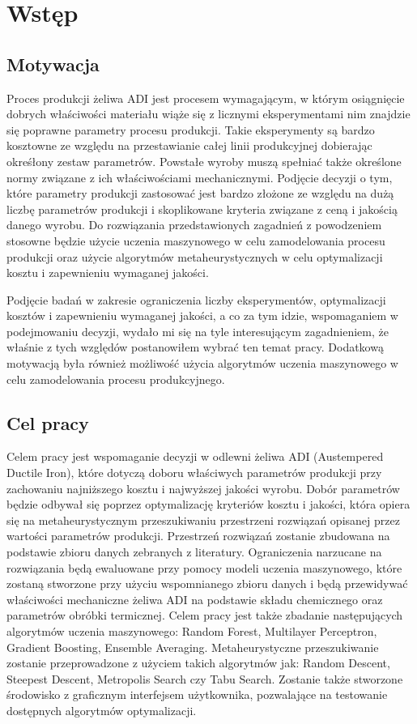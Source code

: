 
\chapter{Wstęp}

\section{Motywacja}
Proces produkcji żeliwa ADI jest procesem wymagającym, w którym osiągnięcie dobrych właściwości materiału wiąże się z licznymi eksperymentami nim znajdzie się poprawne parametry procesu produkcji. Takie eksperymenty są bardzo kosztowne ze względu na przestawianie całej linii produkcyjnej dobierając okreśłony zestaw parametrów. Powstałe wyroby muszą spełniać także określone normy związane z ich właściwościami mechanicznymi. Podjęcie decyzji o tym, które parametry produkcji zastosować jest bardzo złożone ze względu na dużą liczbę parametrów produkcji i skoplikowane kryteria związane z ceną i jakością danego wyrobu. Do rozwiązania przedstawionych zagadnień z powodzeniem stosowne będzie użycie uczenia maszynowego w celu zamodelowania procesu produkcji oraz użycie algorytmów metaheurystycznych w celu optymalizacji kosztu i zapewnieniu wymaganej jakości.

Podjęcie badań w zakresie ograniczenia liczby eksperymentów, optymalizacji kosztów i zapewnieniu wymaganej jakości, a co za tym idzie, wspomaganiem w podejmowaniu decyzji, wydało mi się na tyle interesującym zagadnieniem, że właśnie z tych względów postanowiłem wybrać ten temat pracy. Dodatkową motywacją była również możliwość użycia algorytmów uczenia maszynowego w celu zamodelowania procesu produkcyjnego.

\section{Cel pracy}
Celem pracy jest wspomaganie decyzji w odlewni żeliwa ADI (Austempered Ductile Iron), które dotyczą doboru właściwych parametrów produkcji przy zachowaniu najniższego kosztu i najwyższej jakości wyrobu. Dobór parametrów będzie odbywał się poprzez optymalizację kryteriów kosztu i jakości, która opiera się na metaheurystycznym przeszukiwaniu przestrzeni rozwiązań opisanej przez wartości parametrów produkcji. Przestrzeń rozwiązań zostanie zbudowana na podstawie zbioru danych zebranych z literatury. Ograniczenia narzucane na rozwiązania będą ewaluowane przy pomocy modeli uczenia maszynowego, które zostaną stworzone przy użyciu wspomnianego zbioru danych i będą przewidywać właściwości mechaniczne żeliwa ADI na podstawie składu chemicznego oraz parametrów obróbki termicznej. Celem pracy jest także zbadanie następujących algorytmów uczenia maszynowego: Random Forest, Multilayer Perceptron, Gradient Boosting, Ensemble Averaging. Metaheurystyczne przeszukiwanie zostanie przeprowadzone z użyciem takich algorytmów jak: Random Descent, Steepest Descent, Metropolis Search czy Tabu Search. Zostanie także stworzone środowisko z graficznym interfejsem użytkownika, pozwalające na testowanie dostępnych algorytmów optymalizacji.


